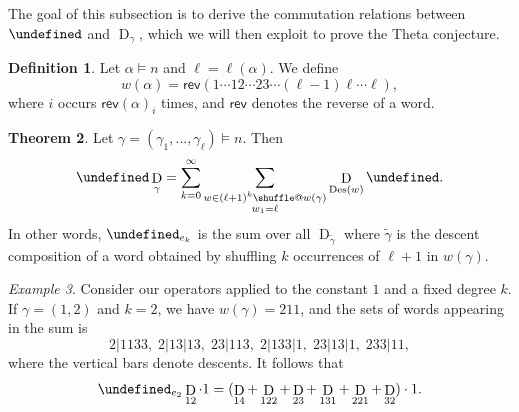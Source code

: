 \documentclass[reqno]{amsart}
\makeatletter
\theoremstyle{plain}
\theoremstyle{definition}
\newtheorem{theorem}{Theorem}[section]
\newtheorem{definition}[theorem]{Definition}
\theoremstyle{remark}
\newtheorem{example}[theorem]{Example}
\DeclareMathOperator{\D}{D}
\DeclareMathOperator{\Des}{Des}
\let\oldTheta\Theta
\let\Theta\undefined
\DeclareMathOperator{\Theta}{\oldTheta}
\providecommand*{\shuffle}{%
  \mathbin{\mathpalette\shuffle@{}}%
}
\newcommand*{\shuffle@}[2]{%
  \sbox0{$#1\vcenter{}$}%
  \kern .15\ht0 %
  \rlap{\vrule height .25\ht0 depth 0pt width 2.5\ht0}%
  \raise.1\ht0\hbox to 2.5\ht0{%
    \vrule height 1.75\ht0 depth -.1\ht0 width .17\ht0 %
    \hfill
    \vrule height 1.75\ht0 depth -.1\ht0 width .17\ht0 %
    \hfill
    \vrule height 1.75\ht0 depth -.1\ht0 width .17\ht0 %
  }%
  \kern .15\ht0 %
}
\newcommand{\<}{\langle}
\renewcommand{\>}{\rangle}
\makeatother
\begin{document}
The goal of this subsection is to derive the commutation relations between $\Theta$ and $\D_\gamma$, which we will then exploit to prove the Theta conjecture.

\begin{definition}
    Let $\alpha \vDash n$ and $\ell = \ell(\alpha)$. We define 
    \[ w(\alpha) = \mathsf{rev}(1 \cdots 1 2 \cdots 23 \cdots (\ell-1) \ell \cdots \ell), \]
    where $i$ occurs $\mathsf{rev}(\alpha)_i$ times, and $\mathsf{rev}$ denotes the reverse of a word.
\end{definition}

\begin{theorem}
    \label{thm:shuffle_theta_D}
    Let $\gamma = (\gamma_1, \dots, \gamma_\ell) \vDash n$. Then
    \[ \Theta \D_\gamma = \sum_{k=0}^\infty \sum_{\substack{w \in (\ell+1)^k \shuffle w(\gamma) \\ w_1 = \ell}} \D_{\Des(w)} \Theta. \]
    In other words, $\Theta_{e_k}$ is the sum over all $\D_{\tilde{\gamma}}$ where ${\tilde{\gamma}}$ is the descent composition of a word obtained by shuffling $k$ occurrences of $\ell+1$ in $w(\gamma)$.
\end{theorem}

\begin{example}
    Consider our operators applied to the constant $1$ and a fixed degree $k$. If $\gamma = (1,2)$ and $k=2$, we have $w(\gamma) = 211$, and the sets of words appearing in the sum is \[ 2|1133, \; 2|13|13, \; 23|113, \; 2|133|1, \; 23|13|1, \; 233|11, \] where the vertical bars denote descents. It follows that \[ \Theta_{e_2} \D_{12} \cdot 1 = (\D_{14} + \D_{122} + \D_{23} + \D_{131} + \D_{221} + \D_{32}) \cdot 1. \] 
\end{example}
\end{document}
